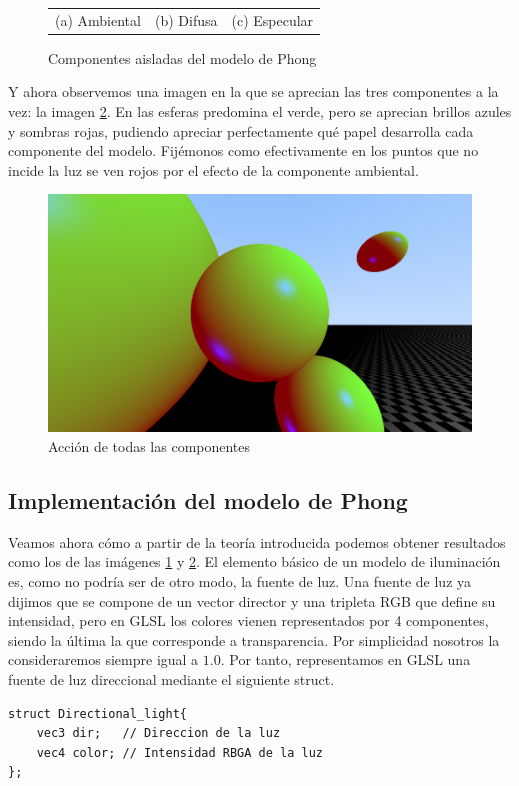 \begin{figure}[ht]
\begin{tabular}{ccc}
    (a) Ambiental & (b) Difusa & (c) Especular \\[6pt]
    \end{tabular}
    \caption{Componentes aisladas del modelo de Phong}
    \label{fig:componentes-aisladas}
\end{figure}

Y ahora observemos una imagen en la que se aprecian las tres componentes a la vez: la imagen \ref{fig:todas-componentes}. En las esferas predomina el verde, pero se aprecian brillos azules y sombras rojas, pudiendo apreciar perfectamente qué papel desarrolla cada componente del modelo. Fijémonos como efectivamente en los puntos que no incide la luz se ven rojos por el efecto de la componente ambiental.

\begin{figure} [ht]
    \centering
    \includegraphics[scale = 0.23]{img/C7/todas-componentes.png}
    \caption{Acción de todas las componentes}
    \label{fig:todas-componentes}
\end{figure}

\subsection{Implementación del modelo de Phong}

Veamos ahora cómo a partir de la teoría introducida podemos obtener resultados como los de las imágenes \ref{fig:componentes-aisladas} y \ref{fig:todas-componentes}. El elemento básico de un modelo de iluminación es, como no podría ser de otro modo, la fuente de luz. Una fuente de luz ya dijimos que se compone de un vector director y una tripleta RGB que define su intensidad, pero en GLSL los colores vienen representados por 4 componentes, siendo la última la que corresponde a transparencia. Por simplicidad nosotros la consideraremos siempre igual a $1.0$. Por tanto, representamos en GLSL una fuente de luz direccional mediante el siguiente struct.
\begin{lstlisting}
struct Directional_light{
    vec3 dir;   // Direccion de la luz
    vec4 color; // Intensidad RBGA de la luz
};    
\end{lstlisting}

